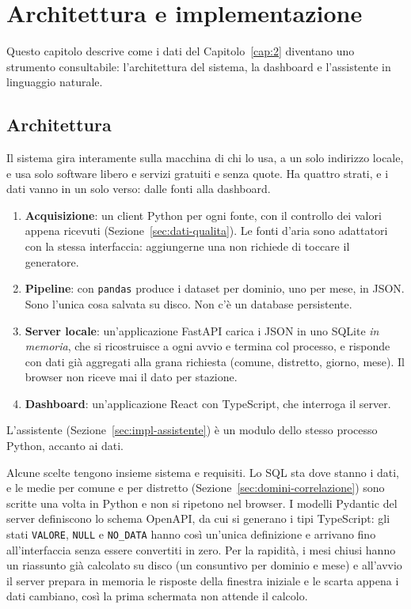 \chapter{Architettura e implementazione}
\label{cap:3}

Questo capitolo descrive come i dati del Capitolo~\ref{cap:2} diventano uno strumento consultabile: l'architettura del sistema, la dashboard e l'assistente in linguaggio naturale.

\section{Architettura}
\label{sec:impl-architettura}

Il sistema gira interamente sulla macchina di chi lo usa, a un solo indirizzo locale, e usa solo software libero e servizi gratuiti e senza quote. Ha quattro strati, e i dati vanno in un solo verso: dalle fonti alla dashboard.
\begin{enumerate}
  \item \textbf{Acquisizione}: un client Python per ogni fonte, con il controllo dei valori appena ricevuti (Sezione~\ref{sec:dati-qualita}). Le fonti d'aria sono adattatori con la stessa interfaccia: aggiungerne una non richiede di toccare il generatore.
  \item \textbf{Pipeline}: con \texttt{pandas} produce i dataset per dominio, uno per mese, in JSON. Sono l'unica cosa salvata su disco. Non c'è un database persistente.
  \item \textbf{Server locale}: un'applicazione FastAPI carica i JSON in uno SQLite \emph{in memoria}, che si ricostruisce a ogni avvio e termina col processo, e risponde con dati già aggregati alla grana richiesta (comune, distretto, giorno, mese). Il browser non riceve mai il dato per stazione.
  \item \textbf{Dashboard}: un'applicazione React con TypeScript, che interroga il server.
\end{enumerate}
L'assistente (Sezione~\ref{sec:impl-assistente}) è un modulo dello stesso processo Python, accanto ai dati.

Alcune scelte tengono insieme sistema e requisiti. Lo SQL sta dove stanno i dati, e le medie per comune e per distretto (Sezione~\ref{sec:domini-correlazione}) sono scritte una volta in Python e non si ripetono nel browser. I modelli Pydantic del server definiscono lo schema OpenAPI, da cui si generano i tipi TypeScript: gli stati \texttt{VALORE}, \texttt{NULL} e \texttt{NO\_DATA} hanno così un'unica definizione e arrivano fino all'interfaccia senza essere convertiti in zero. Per la rapidità, i mesi chiusi hanno un riassunto già calcolato su disco (un consuntivo per dominio e mese) e all'avvio il server prepara in memoria le risposte della finestra iniziale e le scarta appena i dati cambiano, così la prima schermata non attende il calcolo.

